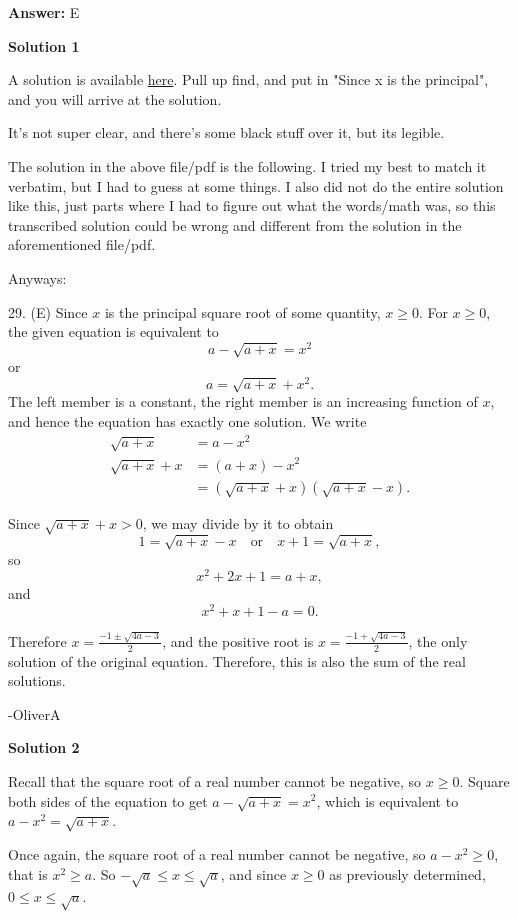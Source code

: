 \begin{enumerate}
 \textbf{Answer: }E



\textbf{Solution 1}

A solution is available \href{https://files.eric.ed.gov/fulltext/ED239856.pdf}{here}. Pull up find, and put in "Since x is the principal", and you will arrive at the solution.

 It's not super clear, and there's some black stuff over it, but its legible. 

 The solution in  the above file/pdf is the following. I tried my best to match it verbatim, but I had to guess at some things. I also did not do the entire solution like this, just parts where I had to figure out what the words/math was, so this transcribed solution could be wrong and different from the solution in the aforementioned file/pdf.

 Anyways:

 29. (E) Since $x$ is the principal square root of some quantity, $x\geq0$. For $x\geq0$, the given equation is equivalent to 
 \[a-\sqrt{a+x}=x^2\] or 
 \[a=\sqrt{a+x}+x^2.\] The left member is a constant, the right member is an increasing function of $x$, and hence the equation has exactly one solution. We write 
 \begin{align*} \sqrt{a+x}&=a-x^2 \\ \sqrt{a+x}+x&=(a+x)-x^2 \\ &=(\sqrt{a+x}+x)(\sqrt{a+x}-x). \end{align*}


 Since $\sqrt{a+x}+x>0$, we may divide by it to obtain 
 \[1=\sqrt{a+x}-x\quad\text{or}\quad x+1=\sqrt{a+x},\]so 
 \[x^2+2x+1=a+x,\] and 
 \[x^2+x+1-a=0.\]

 Therefore $x=\frac{-1\pm\sqrt{4a-3}}{2}$, and the positive root is $x=\frac{-1+\sqrt{4a-3}}{2}$, the only solution of the original equation. Therefore, this is also the sum of the real solutions.

 -OliverA

 



\textbf{Solution 2}

Recall that the square root of a real number cannot be negative, so $x \geq 0$.  Square both sides of the equation to get $a - \sqrt{a + x} = x^2$, which is equivalent to $a - x^2 = \sqrt{a+x}$.    

 Once again, the square root of a real number cannot be negative, so $a - x^2 \geq 0$, that is $x^2 \geq a$.  So $-\sqrt{a} \leq x \leq \sqrt{a}$, and since $x \geq 0$ as previously determined, $0 \leq x \leq \sqrt{a}$.  


\end{enumerate}
